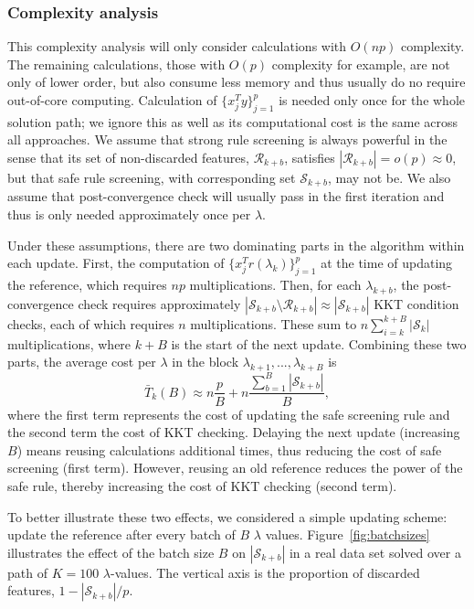 \subsubsection{Complexity analysis}
\label{sec:complexity}

This complexity analysis will only consider calculations with $O(np)$ complexity. The remaining calculations, those with $O(p)$ complexity for example, are not only of lower order, but also consume less memory and thus usually do no require out-of-core computing. Calculation of $\{x_j^Ty\}_{j=1}^p$ is needed only once for the whole solution path; we ignore this as well as its computational cost is the same across all approaches. We assume that strong rule screening is always powerful in the sense that its set of non-discarded features, $\mathcal{R}_{k+b}$, satisfies $|\mathcal{R}_{k+b}|=o(p) \approx 0$, but that safe rule screening, with corresponding set $\mathcal{S}_{k+b}$, may not be. We also assume that post-convergence check will usually pass in the first iteration and thus is only needed approximately once per $\lambda$.

Under these assumptions, there are two dominating parts in the algorithm within each update. First, the computation of $\{x_j^Tr(\lambda_k)\}_{j=1}^p$ at the time of updating the reference, which requires $np$ multiplications. Then, for each $\lambda_{k+b}$, the post-convergence check requires approximately $|\mathcal{S}_{k+b} \setminus \mathcal{R}_{k+b}| \approx |\mathcal{S}_{k+b}|$ KKT condition checks, each of which requires $n$ multiplications. These sum to $n\sum_{i=k}^{k+B}|\mathcal{S}_k|$ multiplications, where $k+B$ is the start of the next update. Combining these two parts, the average cost per $\lambda$ in the block $\lambda_{k+1},...,\lambda_{k+B}$ is
\begin{equation}
    \label{eq:cost}
    \bar{T}_k(B) \approx n\frac{p}{B}+n\frac{\sum_{b=1}^B|\mathcal{S}_{k+b}|}{B},
\end{equation}
where the first term represents the cost of updating the safe screening rule and the second term the cost of KKT checking. Delaying the next update (increasing $B$) means reusing calculations additional times, thus reducing the cost of safe screening (first term). However, reusing an old reference reduces the power of the safe rule, thereby increasing the cost of KKT checking (second term).

To better illustrate these two effects, we considered a simple updating scheme: update the reference after every batch of $B$ $\lambda$ values. Figure~\ref{fig:batchsizes} illustrates the effect of the batch size $B$ on $|\mathcal{S}_{k+b}|$ in a real data set solved over a path of $K=100$ $\lambda$-values. The vertical axis is the proportion of discarded features, $1-|\mathcal{S}_{k+b}|/p$.

